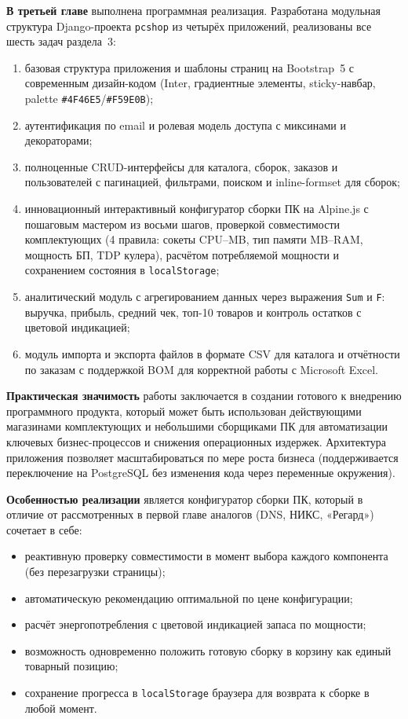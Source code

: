 \documentclass[14pt, a4paper]{extarticle}
\begin{document}
\textbf{В третьей главе} выполнена программная реализация. Разработана модульная структура Django-проекта \texttt{pcshop} из четырёх приложений, реализованы все шесть задач раздела~3:
\begin{enumerate}
    \item базовая структура приложения и шаблоны страниц на Bootstrap~5 с современным дизайн-кодом (Inter, градиентные элементы, sticky-навбар, palette \texttt{\#4F46E5}/\texttt{\#F59E0B});
    \item аутентификация по email и ролевая модель доступа с миксинами и декораторами;
    \item полноценные CRUD-интерфейсы для каталога, сборок, заказов и пользователей с пагинацией, фильтрами, поиском и inline-formset для сборок;
    \item инновационный интерактивный конфигуратор сборки ПК на Alpine.js с пошаговым мастером из восьми шагов, проверкой совместимости комплектующих (4 правила: сокеты CPU--MB, тип памяти MB--RAM, мощность БП, TDP кулера), расчётом потребляемой мощности и сохранением состояния в \texttt{localStorage};
    \item аналитический модуль с агрегированием данных через выражения \texttt{Sum} и \texttt{F}: выручка, прибыль, средний чек, топ-10 товаров и контроль остатков с цветовой индикацией;
    \item модуль импорта и экспорта файлов в формате CSV для каталога и отчётности по заказам с поддержкой BOM для корректной работы с Microsoft Excel.
\end{enumerate}

\textbf{Практическая значимость} работы заключается в создании готового к внедрению программного продукта, который может быть использован действующими магазинами комплектующих и небольшими сборщиками ПК для автоматизации ключевых бизнес-процессов и снижения операционных издержек. Архитектура приложения позволяет масштабироваться по мере роста бизнеса (поддерживается переключение на PostgreSQL без изменения кода через переменные окружения).

\textbf{Особенностью реализации} является конфигуратор сборки ПК, который в отличие от рассмотренных в первой главе аналогов (DNS, НИКС, «Регард») сочетает в себе:
\begin{itemize}
    \item реактивную проверку совместимости в момент выбора каждого компонента (без перезагрузки страницы);
    \item автоматическую рекомендацию оптимальной по цене конфигурации;
    \item расчёт энергопотребления с цветовой индикацией запаса по мощности;
    \item возможность одновременно положить готовую сборку в корзину как единый товарный позицию;
    \item сохранение прогресса в \texttt{localStorage} браузера для возврата к сборке в любой момент.
\end{itemize}
\end{document}
